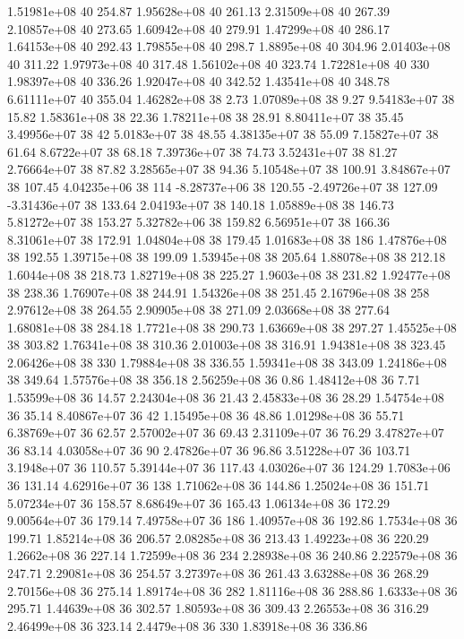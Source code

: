 1.51981e+08 40 254.87
1.95628e+08 40 261.13
2.31509e+08 40 267.39
2.10857e+08 40 273.65
1.60942e+08 40 279.91
1.47299e+08 40 286.17
1.64153e+08 40 292.43
1.79855e+08 40 298.7
1.8895e+08 40 304.96
2.01403e+08 40 311.22
1.97973e+08 40 317.48
1.56102e+08 40 323.74
1.72281e+08 40 330
1.98397e+08 40 336.26
1.92047e+08 40 342.52
1.43541e+08 40 348.78
6.61111e+07 40 355.04
1.46282e+08 38 2.73
1.07089e+08 38 9.27
9.54183e+07 38 15.82
1.58361e+08 38 22.36
1.78211e+08 38 28.91
8.80411e+07 38 35.45
3.49956e+07 38 42
5.0183e+07 38 48.55
4.38135e+07 38 55.09
7.15827e+07 38 61.64
8.6722e+07 38 68.18
7.39736e+07 38 74.73
3.52431e+07 38 81.27
2.76664e+07 38 87.82
3.28565e+07 38 94.36
5.10548e+07 38 100.91
3.84867e+07 38 107.45
4.04235e+06 38 114
-8.28737e+06 38 120.55
-2.49726e+07 38 127.09
-3.31436e+07 38 133.64
2.04193e+07 38 140.18
1.05889e+08 38 146.73
5.81272e+07 38 153.27
5.32782e+06 38 159.82
6.56951e+07 38 166.36
8.31061e+07 38 172.91
1.04804e+08 38 179.45
1.01683e+08 38 186
1.47876e+08 38 192.55
1.39715e+08 38 199.09
1.53945e+08 38 205.64
1.88078e+08 38 212.18
1.6044e+08 38 218.73
1.82719e+08 38 225.27
1.9603e+08 38 231.82
1.92477e+08 38 238.36
1.76907e+08 38 244.91
1.54326e+08 38 251.45
2.16796e+08 38 258
2.97612e+08 38 264.55
2.90905e+08 38 271.09
2.03668e+08 38 277.64
1.68081e+08 38 284.18
1.7721e+08 38 290.73
1.63669e+08 38 297.27
1.45525e+08 38 303.82
1.76341e+08 38 310.36
2.01003e+08 38 316.91
1.94381e+08 38 323.45
2.06426e+08 38 330
1.79884e+08 38 336.55
1.59341e+08 38 343.09
1.24186e+08 38 349.64
1.57576e+08 38 356.18
2.56259e+08 36 0.86
1.48412e+08 36 7.71
1.53599e+08 36 14.57
2.24304e+08 36 21.43
2.45833e+08 36 28.29
1.54754e+08 36 35.14
8.40867e+07 36 42
1.15495e+08 36 48.86
1.01298e+08 36 55.71
6.38769e+07 36 62.57
2.57002e+07 36 69.43
2.31109e+07 36 76.29
3.47827e+07 36 83.14
4.03058e+07 36 90
2.47826e+07 36 96.86
3.51228e+07 36 103.71
3.1948e+07 36 110.57
5.39144e+07 36 117.43
4.03026e+07 36 124.29
1.7083e+06 36 131.14
4.62916e+07 36 138
1.71062e+08 36 144.86
1.25024e+08 36 151.71
5.07234e+07 36 158.57
8.68649e+07 36 165.43
1.06134e+08 36 172.29
9.00564e+07 36 179.14
7.49758e+07 36 186
1.40957e+08 36 192.86
1.7534e+08 36 199.71
1.85214e+08 36 206.57
2.08285e+08 36 213.43
1.49223e+08 36 220.29
1.2662e+08 36 227.14
1.72599e+08 36 234
2.28938e+08 36 240.86
2.22579e+08 36 247.71
2.29081e+08 36 254.57
3.27397e+08 36 261.43
3.63288e+08 36 268.29
2.70156e+08 36 275.14
1.89174e+08 36 282
1.81116e+08 36 288.86
1.6333e+08 36 295.71
1.44639e+08 36 302.57
1.80593e+08 36 309.43
2.26553e+08 36 316.29
2.46499e+08 36 323.14
2.4479e+08 36 330
1.83918e+08 36 336.86
